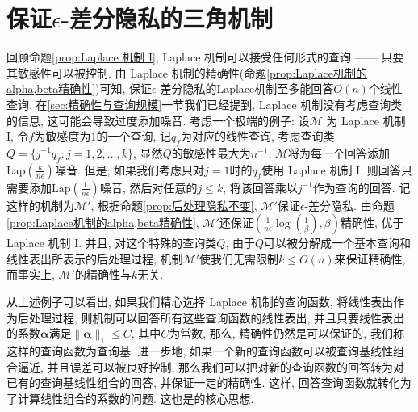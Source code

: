 \section{保证\texorpdfstring{$\epsilon$}{ϵ}-差分隐私的三角机制} %
\label{sec:_epsilon_差分隐私机制}
回顾命题\ref{prop:Laplace 机制 I}, Laplace 机制可以接受任何形式的查询 ------ 只要其敏感性可以被控制. 由 Laplace 机制的精确性(命题\ref{prop:Laplace机制的alpha,beta精确性})可知, 保证$\epsilon$-差分隐私的Laplace机制至多能回答$O(n)$个线性查询. 在\ref{sec:精确性与查询规模}一节我们已经提到, Laplace 机制没有考虑查询类的信息, 这可能会导致过度添加噪音. 考虑一个极端的例子: 设$\mathcal{M}$ 为 Laplace 机制 I, 令$f$为敏感度为$1$的一个查询, 记$q_f$为对应的线性查询, 考虑查询类$Q = \{j^{-1}q_f\colon j = 1, 2, \dots, k\}$, 显然$Q$的敏感性最大为$n^{-1}$, $\mathcal{M}$将为每一个回答添加$\mathrm{Lap}\left(\frac{k}{n\epsilon}\right)$噪音. 但是, 如果我们考虑只对$j = 1$时的$q_f$使用 Laplace 机制 I, 则回答只需要添加$\mathrm{Lap}\left(\frac{1}{n\epsilon}\right)$噪音, 然后对任意的$j\le k$, 将该回答乘以$j^{-1}$作为查询的回答. 记这样的机制为$\mathcal{M}'$, 根据命题\ref{prop:后处理隐私不变}, $\mathcal{M}'$保证$\epsilon$-差分隐私. 由命题\ref{prop:Laplace机制的alpha,beta精确性}, $\mathcal{M}'$还保证$\left(\frac{1}{n\epsilon}\log(\frac{1}{\beta}), \beta\right)$精确性, 优于 Laplace 机制 I. 并且, 对这个特殊的查询类$Q$, 由于$Q$可以被分解成一个基本查询和线性表出所表示的后处理过程, 机制$\mathcal{M}'$使我们无需限制$k \le O(n)$来保证精确性, 而事实上, $\mathcal{M}'$的精确性与$k$无关. 

从上述例子可以看出, 如果我们精心选择 Laplace 机制的查询函数, 将线性表出作为后处理过程, 则机制可以回答所有这些查询函数的线性表出, 并且只要线性表出的系数$\boldsymbol{\alpha}$满足$\|\boldsymbol{\alpha}\|_1 \le C$, 其中$C$为常数, 那么, 精确性仍然是可以保证的, 我们称这样的查询函数为查询基. 进一步地, 如果一个新的查询函数可以被查询基线性组合逼近, 并且误差可以被良好控制, 那么我们可以把对新的查询函数的回答转为对已有的查询基线性组合的回答, 并保证一定的精确性. 这样, 回答查询函数就转化为了计算线性组合的系数的问题. 这也是\parencite{wang2013efficient}的核心思想.


